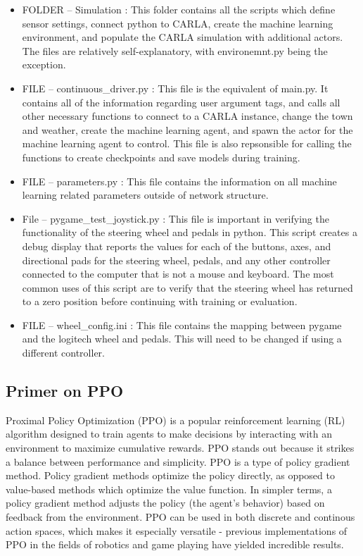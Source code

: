 \documentclass[12pt,oneside,letterpaper]{article}
\begin{document}
\begin{itemize}
\item FOLDER -- Simulation : This folder contains all the scripts which define sensor settings, connect python to CARLA, create the machine learning environment, and populate the CARLA simulation with additional actors. The files are relatively self-explanatory, with environemnt.py being the exception.
\item FILE -- continuous\_driver.py : This file is the equivalent of main.py. It contains all of the information regarding user argument tags, and calls all other necessary functions to connect to a CARLA instance, change the town and weather, create the machine learning agent, and spawn the actor for the machine learning agent to control. This file is also repsonsible for calling the functions to create checkpoints and save models during training.
\item FILE -- parameters.py : This file contains the information on all machine learning related parameters outside of network structure.
\item File -- pygame\_test\_joystick.py : This file is important in verifying the functionality of the steering wheel and pedals in python. This script creates a debug display that reports the values for each of the buttons, axes, and directional pads for the steering wheel, pedals, and any other controller connected to the computer that is not a mouse and keyboard. The most common uses of this script are to verify that the steering wheel has returned to a zero position before continuing with training or evaluation.
\item FILE -- wheel\_config.ini : This file contains the mapping between pygame and the logitech wheel and pedals. This will need to be changed if using a different controller.

\end{itemize}

\subsection{Primer on PPO}

Proximal Policy Optimization (PPO) is a popular reinforcement learning (RL) algorithm designed to train agents to make decisions by interacting with an environment to maximize cumulative rewards. PPO stands out because it strikes a balance between performance and simplicity. PPO is a type of policy gradient method. Policy gradient methods optimize the policy directly, as opposed to value-based methods which optimize the value function. In simpler terms, a policy gradient method adjusts the policy (the agent’s behavior) based on feedback from the environment. PPO can be used in both discrete and continous action spaces, which makes it especially versatile - previous implementations of PPO in the fields of robotics and game playing have yielded incredible results. \\
\end{document}
